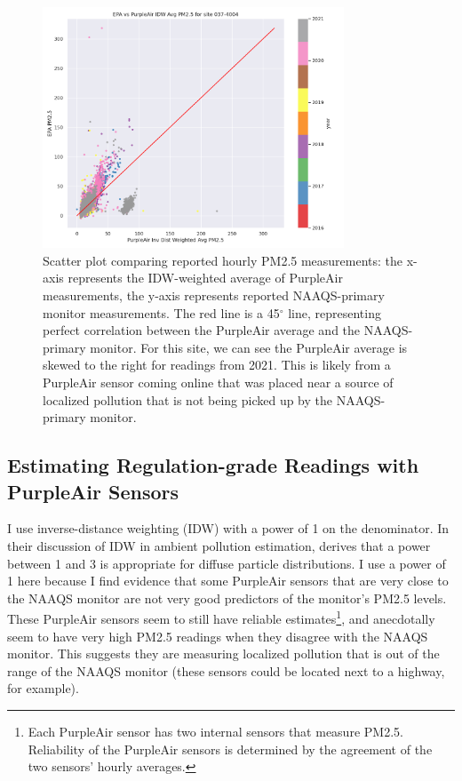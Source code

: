 \documentclass[12pt]{article}
\begin{document}
\FloatBarrier
\begin{figure}[ht]
\centering
\includegraphics[width=0.8\textwidth]{site-037-4004_epa-pa-hourly-plot.png}
\caption{Scatter plot comparing reported hourly PM2.5 measurements: the x-axis represents the IDW-weighted average of PurpleAir measurements, the y-axis represents reported NAAQS-primary monitor measurements. The red line is a 45$^\circ$ line, representing perfect correlation between the PurpleAir average and the NAAQS-primary monitor. For this site, we can see the PurpleAir average is skewed to the right for readings from 2021. This is likely from a PurpleAir sensor coming online that was placed near a source of localized pollution that is not being picked up by the NAAQS-primary monitor.}
\label{fig:pa-epa-compare_037-4004}
\end{figure}


\FloatBarrier

\subsection{Estimating Regulation-grade Readings with PurpleAir Sensors} 
I use inverse-distance weighting (IDW) with a power of 1 on the denominator. In their discussion of IDW in ambient pollution estimation, \cite{demesnardPollutionModelsInverse2013} derives that a power between 1 and 3 is appropriate for diffuse particle distributions. I use a power of 1 here because I find evidence that some PurpleAir sensors that are very close to the NAAQS monitor are not very good predictors of the monitor's PM2.5 levels. These PurpleAir sensors seem to still have reliable estimates\footnote{Each PurpleAir sensor has two internal sensors that measure PM2.5. Reliability of the PurpleAir sensors is determined by the agreement of the two sensors' hourly averages.}, and anecdotally seem to have very high PM2.5 readings when they disagree with the NAAQS monitor. This suggests they are measuring localized pollution that is out of the range of the NAAQS monitor (these sensors could be located next to a highway, for example).
\end{document}
